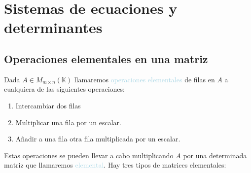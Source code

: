 \section{Sistemas de ecuaciones y determinantes}
\subsection{Operaciones elementales en una matriz}
Dada $A\in M_{m\times n}(\mathbb{K})$ llamaremos \textcolor{lightblue}{operaciones elementales} de filas en $A$ a cualquiera de las siguientes operaciones:
\begin{enumerate}[label=\color{lightblue}\arabic*)]
	\item Intercambiar dos filas
	\item Multiplicar una fila por un escalar.
	\item Añadir a una fila otra fila multiplicada por un escalar.
\end{enumerate}
Estas operaciones se pueden llevar a cabo multiplicando $A$ por una determinada matriz que llamaremos \textcolor{lightblue}{elemental}. Hay tres tipos de matrices elementales:

